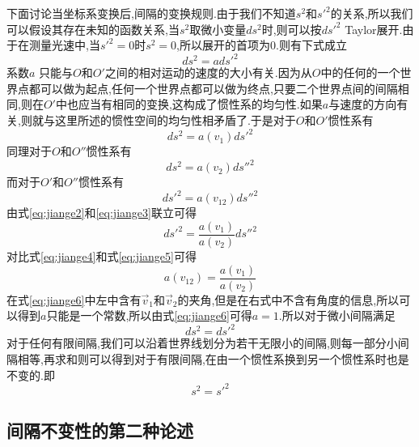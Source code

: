下面讨论当坐标系变换后,间隔的变换规则.由于我们不知道$s^2$和$s'^2$的关系,所以我们可以假设其存在未知的函数关系,当$s^2$取微小变量$ds^2$时,则可以按$ds'^2$ Taylor展开.由于在测量光速中,当$s'^2=0$时$s^2=0$,所以展开的首项为0.则有下式成立
\begin{equation}
  ds^2=ads'^2
  \label{eq:jiange1}
\end{equation}
系数$a$ 只能与$O$和$O'$之间的相对运动的速度的大小有关.因为从$O$中的任何的一个世界点都可以做为起点,任何一个世界点都可以做为终点,只要二个世界点间的间隔相同,则在$O'$中也应当有相同的变换,这构成了惯性系的均匀性.如果$a$与速度的方向有关,则就与这里所述的惯性空间的均匀性相矛盾了.于是对于$O$和$O'$惯性系有
\begin{equation}
  ds^2=a(v_{1})ds'^2
  \label{eq:jiange2}
\end{equation}
同理对于$O$和$O''$惯性系有
\begin{equation}
  ds^2=a(v_{2})ds''^2
  \label{eq:jiange3}
\end{equation}
而对于$O'$和$O''$惯性系有
\begin{equation}
  ds'^2=a(v_{12})ds''^2
  \label{eq:jiange4}
\end{equation}
由式\eqref{eq:jiange2}和\eqref{eq:jiange3}联立可得
\begin{equation}
  ds'^2=\frac{a(v_{1})}{a(v_{2})}ds''^2
  \label{eq:jiange5}
\end{equation}
对比式\eqref{eq:jiange4}和式\eqref{eq:jiange5}可得
\begin{equation}
  a(v_{12})=\frac{a(v_{1})}{a(v_{2})}
  \label{eq:jiange6}
\end{equation}
在式\eqref{eq:jiange6}中左中含有$\vec{v}_1$和$\vec{v}_2$的夹角,但是在右式中不含有角度的信息,所以可以得到$a$只能是一个常数,所以由式\eqref{eq:jiange6}可得$a=1$.所以对于微小间隔满足
\begin{equation}
  ds^2=ds'^2
  \label{eq:jiange7}
\end{equation}
对于任何有限间隔,我们可以沿着世界线划分为若干无限小的间隔,则每一部分小间隔相等,再求和则可以得到对于有限间隔,在由一个惯性系换到另一个惯性系时也是不变的.即
\begin{equation}
  s^2=s'^2
  \label{eq:jiange8}
\end{equation}

\subsection{间隔不变性的第二种论述}

